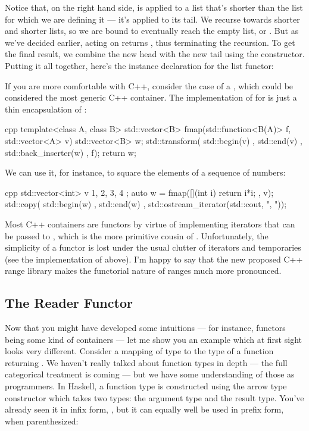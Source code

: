 Notice that, on the right hand side,  is applied to a
list that's shorter than the list for which we are defining it --- it's
applied to its tail. We recurse towards shorter and shorter lists, so we
are bound to eventually reach the empty list, or . But as
we've decided earlier,  acting on  returns
, thus terminating the recursion. To get the final result,
we combine the new head  with the new tail
 using the  constructor. Putting it
all together, here's the instance declaration for the list functor:

If you are more comfortable with C++, consider the case of a
, which could be considered the most generic C++
container. The implementation of  for 
is just a thin encapsulation of :

\begin{snip}{cpp}
template<class A, class B>
std::vector<B> fmap(std::function<B(A)> f, std::vector<A> v) {
    std::vector<B> w;
    std::transform( std::begin(v)
                  , std::end(v)
                  , std::back_inserter(w)
                  , f);
    return w;
}
\end{snip}
We can use it, for instance, to square the elements of a sequence of
numbers:

\begin{snip}{cpp}
std::vector<int> v{ 1, 2, 3, 4 };
auto w = fmap([](int i) { return i*i; }, v);
std::copy( std::begin(w)
         , std::end(w)
         , std::ostream_iterator(std::cout, ", "));
\end{snip}
Most C++ containers are functors by virtue of implementing iterators
that can be passed to , which is the more
primitive cousin of . Unfortunately, the simplicity of a
functor is lost under the usual clutter of iterators and temporaries
(see the implementation of  above). I'm happy to say that
the new proposed C++ range library makes the functorial nature of ranges
much more pronounced.

\subsection{The Reader Functor}

Now that you might have developed some intuitions --- for instance,
functors being some kind of containers --- let me show you an example
which at first sight looks very different. Consider a mapping of type
 to the type of a function returning . We haven't
really talked about function types in depth --- the full categorical
treatment is coming --- but we have some understanding of those as
programmers. In Haskell, a function type is constructed using the arrow
type constructor \code{(->)} which takes two types: the
argument type and the result type. You've already seen it in infix form,
, but it can equally well be used in prefix
form, when parenthesized:

